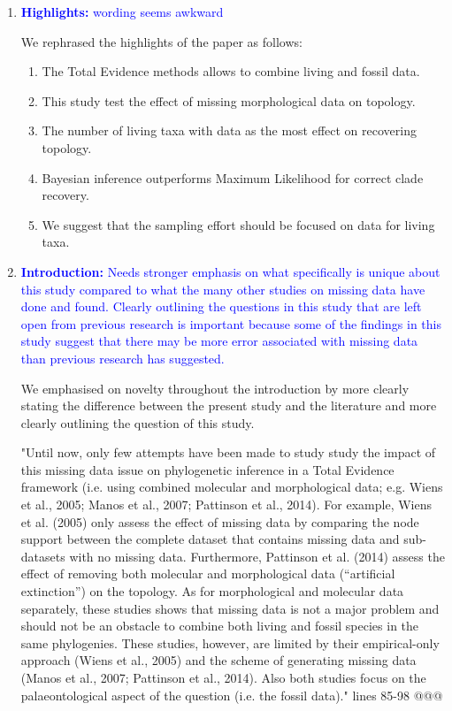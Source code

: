 \documentclass[12pt,letterpaper]{article}
\begin{document}
\begin{enumerate}
\item{\textcolor{blue}{\textbf{Highlights:} wording seems awkward}}

We rephrased the highlights of the paper as follows: %

\begin{enumerate}[(1)]
\item The Total Evidence methods allows to combine living and fossil data.
\item This study test the effect of missing morphological data on topology.
\item The number of living taxa with data as the most effect on recovering topology.
\item Bayesian inference outperforms Maximum Likelihood for correct clade recovery.
\item We suggest that the sampling effort should be focused on data for living taxa.
\end{enumerate}


\item{\textcolor{blue}{\textbf{Introduction:} Needs stronger emphasis on what specifically is unique about this study compared to what the many other studies on missing data have done and found.
Clearly outlining the questions in this study that are left open from previous research is important because some of the findings in this study suggest that there may be more error associated with missing data than previous research has suggested.}}

We emphasised on novelty throughout the introduction by more clearly stating the difference between the present study and the literature and more clearly outlining the question of this study.

"Until now, only few attempts have been made to study study the impact of this missing data issue on phylogenetic inference in a Total Evidence framework (i.e. using combined molecular and morphological data; e.g. Wiens et al., 2005; Manos et al., 2007; Pattinson et al., 2014).
For example, Wiens et al. (2005) only assess the effect of missing data by comparing the node support between the complete dataset that contains missing data and sub-datasets with no missing data.
Furthermore, Pattinson et al. (2014) assess the effect of removing both molecular and morphological data (“artificial extinction”) on the topology.
As for morphological and molecular data separately, these studies shows that missing data is not a major problem and should not be an obstacle to combine both living and fossil species in the same phylogenies.
These studies, however, are limited by their empirical-only approach (Wiens et al., 2005) and the scheme of generating missing data (Manos et al., 2007; Pattinson et al., 2014).
Also both studies focus on the palaeontological aspect of the question (i.e. the fossil data)." lines 85-98 @@@


\end{enumerate}
\end{document}
